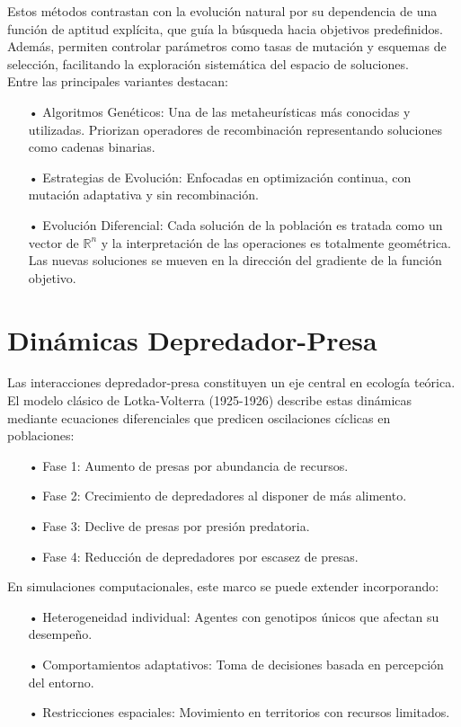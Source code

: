 \documentclass[letterpaper, 12pt]{report}
\begin{document}
Estos métodos contrastan con la evolución natural por su dependencia de una función de aptitud explícita, que guía la búsqueda hacia objetivos predefinidos. Además, permiten controlar parámetros como tasas de mutación y esquemas de selección, facilitando la exploración sistemática del espacio de soluciones. \\


Entre las principales variantes destacan:

\begin{itemize}
\item[•] Algoritmos Genéticos: Una de las metaheurísticas más conocidas y utilizadas. Priorizan operadores de recombinación representando soluciones como cadenas binarias.
\item[•] Estrategias de Evolución: Enfocadas en optimización continua, con mutación adaptativa y sin recombinación.
\item[•] Evolución Diferencial: Cada solución de la población es tratada como un vector de $\mathbb{R}^n$ y la interpretación de las operaciones es totalmente geométrica. Las nuevas soluciones se mueven en la dirección del gradiente
de la función objetivo.

\end{itemize}


\section{Dinámicas Depredador-Presa}

Las interacciones depredador-presa constituyen un eje central en ecología teórica. El modelo clásico de Lotka-Volterra (1925-1926) describe estas dinámicas mediante ecuaciones diferenciales que predicen oscilaciones cíclicas en poblaciones:

\begin{itemize}
\item[•] Fase 1: Aumento de presas por abundancia de recursos.
\item[•] Fase 2: Crecimiento de depredadores al disponer de más alimento.
\item[•] Fase 3: Declive de presas por presión predatoria.
\item[•] Fase 4: Reducción de depredadores por escasez de presas.    
\end{itemize}

En simulaciones computacionales, este marco se puede extender incorporando:
\begin{itemize}
\item[•] Heterogeneidad individual: Agentes con genotipos únicos que afectan su desempeño.
\item[•] Comportamientos adaptativos: Toma de decisiones basada en percepción del entorno.
\item[•] Restricciones espaciales: Movimiento en territorios con recursos limitados.
\end{itemize}
\end{document}
